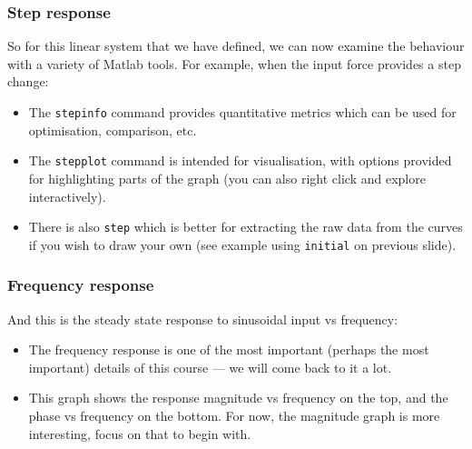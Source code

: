 \documentclass[9pt]{beamer-control}
\begin{document}


\begin{frame}
  \frametitle{Step response}

  So for this linear system that we have defined, we can now examine the behaviour with a variety of Matlab tools. For example, when the input force provides a step change:


  \begin{itemize}
    \item The \texttt{stepinfo} command provides quantitative metrics which can be used for optimisation, comparison, etc.
    \item The \texttt{stepplot} command is intended for visualisation, with options provided for highlighting parts of the graph (you can also right click and explore interactively).
    \item There is also \texttt{step} which is better for extracting the raw data from the curves if you wish to draw your own (see example using \texttt{initial} on previous slide).
  \end{itemize}

\end{frame}


\begin{frame}
  \frametitle{Frequency response}

  And this is the steady state response to sinusoidal input vs frequency:


  \begin{itemize}
    \item The frequency response is one of the most important (perhaps the most important) details of this course --- we will come back to it a lot.
    \item This graph shows the response magnitude vs frequency on the top, and the phase vs frequency on the bottom. For now, the magnitude graph is more interesting, focus on that to begin with.
  \end{itemize}

\end{frame}
\end{document}
